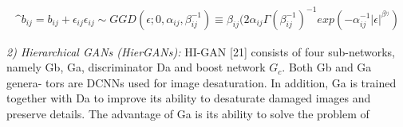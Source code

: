 \documentclass[10pt, a4paper]{article}
\begin{document}
\begin{multicols}{2}
\begin{multline}
     \^ b_{ij} = b_{ij} + \epsilon_{ij}\epsilon_{ij} \sim GGD(\epsilon;0,
    \alpha_{ij},\beta_{ij}^{-1}) \equiv \beta_{ij}(2\alpha_{ij} \Gamma(\beta_{ij} ^{-1})^{-1} exp(-\alpha_{ij}^{-1}|\epsilon|^{\beta^{_{ij}}})
\end{multline}

\textit{2) Hierarchical GANs (HierGANs):} HI-GAN [21] consists of four sub-networks, namely Gb, Ga, discriminator Da and boost network $G_c$. Both Gb and Ga genera- tors are DCNNs used for image desaturation. In addition, Ga is trained together with Da to improve its ability to desaturate damaged images and preserve details. The advantage of Ga is its ability to solve the problem of 

\end{multicols}
\end{document}
